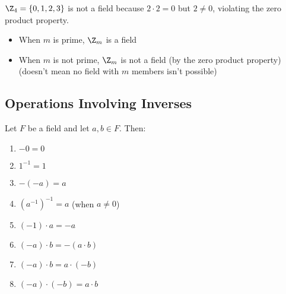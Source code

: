 \begin{eg}
    $\Z_4 = \{0, 1, 2, 3\}$ is not a field because $2 \cdot 2 = 0$ but $2 \neq 0$, violating the zero product property.
\end{eg}

\begin{note}
    \begin{itemize} These facts are important in applications but not central to linear algebra
        \item When $m$ is prime, $\Z_m$ is a field
        \item When $m$ is not prime, $\Z_m$ is not a field (by the zero product property) (doesn't mean no field with $m$ members isn't possible)
    \end{itemize}
\end{note}

\subsection{Operations Involving Inverses}

\begin{proposition}\label{prop:inverse-properties}
    Let $F$ be a field and let $a, b \in F$. Then:
    \begin{enumerate}[label=(\roman*)]
        \item $-0 = 0$
        \item $1^{-1} = 1$
        \item $-(-a) = a$
        \item $(a^{-1})^{-1} = a$ (when $a \neq 0$)
        \item $(-1) \cdot a = -a$
        \item $(-a) \cdot b = -(a \cdot b)$
        \item $(-a) \cdot b = a \cdot (-b)$
        \item $(-a) \cdot (-b) = a \cdot b$
    \end{enumerate}
\end{proposition}

